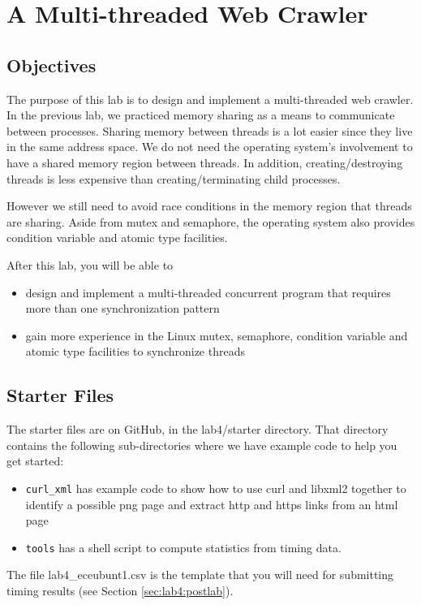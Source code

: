 \chapter{A Multi-threaded Web Crawler}

\section{Objectives}
The purpose of this lab is to design and implement a multi-threaded web crawler. In the previous lab, we practiced memory sharing as a means to communicate between processes. Sharing memory between threads is a lot easier since they live in the same address space. We do not need the operating system's involvement to have a shared memory region between threads. In addition, creating/destroying threads is less expensive than creating/terminating child processes. 

However we still need to avoid race conditions in the memory region that threads are sharing. Aside from mutex and semaphore, the operating system also provides condition variable and atomic type facilities. 

After this lab, you will be able to
\begin{itemize}
\item design and implement a multi-threaded concurrent program that requires more than one synchronization pattern
\item gain more experience in the Linux mutex, semaphore, condition variable and atomic type facilities to synchronize threads
\end{itemize}

\section{Starter Files}
The starter files are on GitHub, in the lab4/starter directory. That directory contains the following sub-directories where we have example code to help you get started:

\begin{itemize}
\item \verb+curl_xml+ has example code to show how to use curl and libxml2 together to identify a possible png page and extract http and https links from an html page
\item \verb+tools+ has a shell script to compute statistics from timing data.
\end{itemize}
The file lab4\_eceubunt1.csv is the template that you will need for submitting timing results (see Section \ref{sec:lab4:postlab}).

